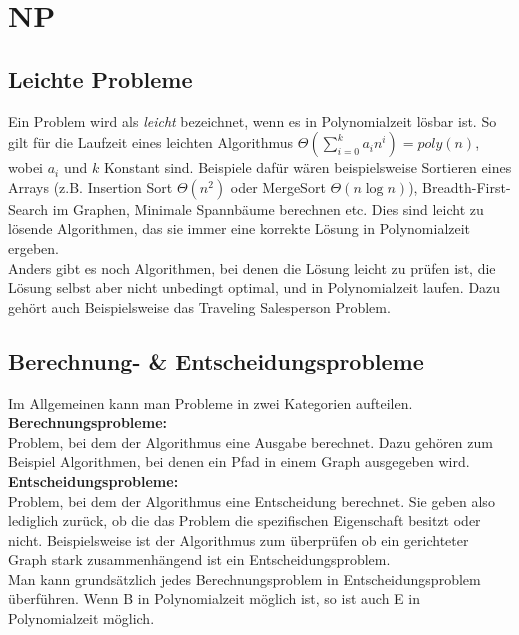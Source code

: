 \documentclass[
../AuD-Zusammenfassung.tex,
]
{subfiles}
\begin{document}
\section{NP}
\subsection{Leichte Probleme}
Ein Problem wird als \textit{leicht} bezeichnet, wenn es in Polynomialzeit lösbar ist. So gilt für die Laufzeit eines leichten Algorithmus $\Theta(\sum_{i=0}^{k} a_in^i) = poly(n)$, wobei $a_i$ und $k$ Konstant sind. Beispiele dafür wären beispielsweise Sortieren eines Arrays (z.B. Insertion Sort $\Theta(n^2)$ oder MergeSort $\Theta(n \log n)$), Breadth-First-Search im Graphen, Minimale Spannbäume berechnen etc. Dies sind leicht zu lösende Algorithmen, das sie immer eine korrekte Lösung in Polynomialzeit ergeben. \\
Anders gibt es noch Algorithmen, bei denen die Lösung leicht zu prüfen ist, die Lösung selbst aber nicht unbedingt optimal, und in Polynomialzeit laufen. Dazu gehört auch Beispielsweise das Traveling Salesperson Problem.
\subsection{Berechnung- \& Entscheidungsprobleme}
Im Allgemeinen kann man Probleme in zwei Kategorien aufteilen. \\
\textbf{Berechnungsprobleme:}\\
Problem, bei dem der Algorithmus eine Ausgabe berechnet. Dazu gehören zum Beispiel Algorithmen, bei denen ein Pfad in einem Graph ausgegeben wird. \\
\textbf{Entscheidungsprobleme:}\\
Problem, bei dem der Algorithmus eine Entscheidung berechnet. Sie geben also lediglich zurück, ob die das Problem die spezifischen Eigenschaft besitzt oder nicht. Beispielsweise ist der Algorithmus zum überprüfen ob ein gerichteter Graph stark zusammenhängend ist ein Entscheidungsproblem.\\
Man kann grundsätzlich jedes Berechnungsproblem in Entscheidungsproblem überführen. Wenn B in Polynomialzeit möglich ist, so ist auch E in Polynomialzeit möglich.\\
\end{document}
